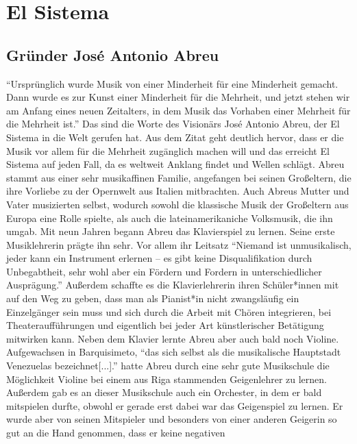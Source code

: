 \section{El Sistema}

\subsection{Gründer José Antonio Abreu}

\enquote{Ursprünglich wurde Musik von einer Minderheit für eine Minderheit
gemacht. Dann wurde es zur Kunst einer Minderheit für die Mehrheit, und jetzt
stehen wir am Anfang eines neuen Zeitalters, in dem Musik das Vorhaben einer
Mehrheit für die Mehrheit ist.} \autocite[5]{kaufmann:el_sistema} Das sind die
Worte des Visionärs José Antonio Abreu, der El Sistema in die Welt gerufen hat. Aus dem Zitat geht
deutlich hervor, dass er die Musik vor allem für die Mehrheit zugänglich machen
will und das erreicht El Sistema auf jeden Fall, da es weltweit Anklang findet
und Wellen schlägt. Abreu stammt aus einer sehr musikaffinen Familie, angefangen
bei seinen Großeltern, die ihre Vorliebe zu der Opernwelt aus Italien
mitbrachten. Auch Abreus Mutter und Vater musizierten selbst, wodurch sowohl die
klassische Musik der Großeltern aus Europa eine Rolle spielte, als auch die
lateinamerikaniche Volksmusik, die ihn umgab. Mit neun Jahren begann Abreu das
Klavierspiel zu lernen. Seine erste Musiklehrerin prägte ihn sehr. Vor allem ihr
Leitsatz \enquote{Niemand ist unmusikalisch, jeder kann ein Instrument erlernen
– es gibt keine Disqualifikation durch Unbegabtheit, sehr wohl aber ein Fördern
und Fordern in unterschiedlicher Ausprägung.} \autocite[20]{kaufmann:el_sistema}
Außerdem schaffte es die Klavierlehrerin ihren Schüler*innen mit auf den Weg zu
geben, dass man als Pianist*in nicht zwangsläufig ein Einzelgänger sein muss und
sich durch die Arbeit mit Chören integrieren, bei Theateraufführungen und
eigentlich bei jeder Art künstlerischer Betätigung mitwirken kann. Neben dem
Klavier lernte Abreu aber auch bald noch Violine. Aufgewachsen in Barquisimeto,
\enquote{das sich selbst als die musikalische Hauptstadt Venezuelas
bezeichnet[...].} \autocite[22]{kaufmann:el_sistema} hatte Abreu durch eine sehr
gute Musikschule die Möglichkeit Violine bei einem aus Riga stammenden
Geigenlehrer zu lernen. Außerdem gab es an dieser Musikschule auch ein
Orchester, in dem er bald mitspielen durfte, obwohl er gerade erst dabei war das
Geigenspiel zu lernen. Er wurde aber von seinen Mitspieler und besonders von
einer anderen Geigerin so gut an die Hand genommen, dass er keine negativen

